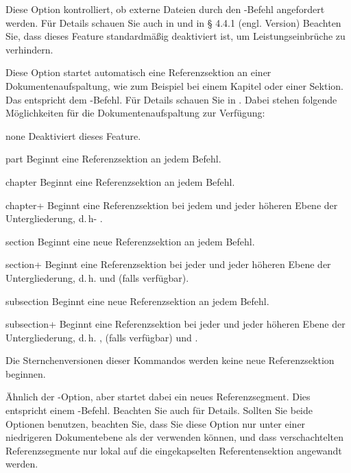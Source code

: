 \documentclass{ltxdockit}[2011/03/25]
\begin{document}
\begin{optionlist}

Diese Option kontrolliert, ob externe Dateien durch den -Befehl
angefordert werden. Für Details schauen Sie auch in  und
 in § 4.4.1 (engl. Version) %
Beachten Sie, dass dieses Feature
standardmäßig deaktiviert ist, um Leistungseinbrüche zu verhindern.


Diese Option startet automatisch eine Referenzsektion an einer
Dokumentenaufspaltung, wie zum Beispiel bei einem Kapitel oder einer Sektion.
Das entspricht dem -Befehl. Für Details schauen Sie in
. Dabei stehen folgende Möglichkeiten für die
Dokumentenaufspaltung zur Verfügung:

\begin{valuelist} 
\item[none] Deaktiviert dieses Feature.  
\item[part] Beginnt eine Referenzsektion an jedem  Befehl.  
\item[chapter] Beginnt eine
Referenzsektion an jedem  Befehl.	
\item[chapter+] Beginnt eine Referenzsektion bei jedem   
    und jeder höheren Ebene der Untergliederung, d.\,h- .
\item[section] Beginnt eine neue
Referenzsektion an jedem  Befehl. 
\item[section+] Beginnt eine Referenzsektion bei jeder  und jeder höheren Ebene der Untergliederung, d.\,h.  und  (falls verfügbar).
\item[subsection] Beginnt eine
neue Referenzsektion an jedem  Befehl. 
\item[subsection+] Beginnt eine Referenzsektion bei jeder 
und jeder höheren Ebene der Untergliederung, d.\,h. ,  
    (falls verfügbar) und .

\end{valuelist}
%
Die Sternchenversionen dieser Kommandos werden keine neue Referenzsektion
beginnen.


Ähnlich der -Option, aber startet dabei ein neues
Referenzsegment. Dies entspricht einem -Befehl. Beachten Sie
auch  für Details. Sollten Sie beide Optionen benutzen,
beachten Sie, dass Sie diese Option nur unter einer niedrigeren
Dokumentebene als der  verwenden können, und dass
verschachtelten Referenzsegmente nur lokal auf die eingekapselten
Referentensektion angewandt werden.


\end{optionlist}
\end{document}
